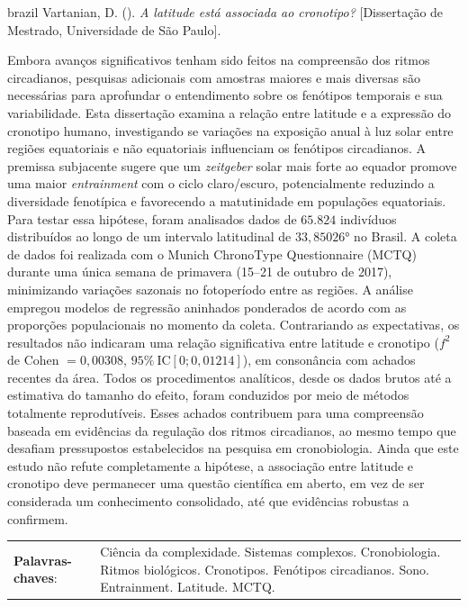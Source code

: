 \documentclass[
12pt,
openright,
oneside,
a4paper,
chapter=TITLE,
section=TITLE,
french,
spanish,
brazil,
english
]{abntex2}
\newcommand{\resumoestrangeironame}{Resumo}
\renewcommand{\resumoname}{Abstract}
\renewcommand{\resumoestrangeironame}{Resumo}
\renewcommand{\resumoname}{Resumo}
\renewcommand{\resumoestrangeironame}{Abstract}
\renewcommand{\resumoname}{Resumen}
\renewcommand{\resumoestrangeironame}{Resumo}
\renewcommand{\resumoname}{Résumé}
\renewcommand{\resumoestrangeironame}{Resumo}
\newenvironment{resumoenv}[1][\resumoname]{
  \pretextualchapter{#1}
  \begingroup
  \setlength{\parindent}{0cm}
  \setlength{\parskip}{\smallskipamount} %
  \AtBeginEnvironment{tabular}{\normalsize}
  \renewcommand{\arraystretch}{1}
  \setlength{\aboverulesep}{0ex}
  \setlength{\belowrulesep}{0ex}
  \setlength{\arrayrulewidth}{0pt}
  \setlength{\tabcolsep}{0cm}
  \vspace{-\smallskipamount} %
  \begin{SingleSpace}
}{
  \end{SingleSpace}
  \cleardoublepage
  \endgroup
}
\renewcommand{\arraystretch}{1.5}
\begin{document}

\begin{resumoenv}[\resumoestrangeironame]
\begin{otherlanguage*}{brazil}
Vartanian, D. ({\imprimirdata}). \textit{A latitude está associada ao cronotipo?} [Dissertação de Mestrado, Universidade de São Paulo].


Embora avanços significativos tenham sido feitos na compreensão dos
ritmos circadianos, pesquisas adicionais com amostras maiores e mais
diversas são necessárias para aprofundar o entendimento sobre os
fenótipos temporais e sua variabilidade. Esta dissertação examina a
relação entre latitude e a expressão do cronotipo humano, investigando
se variações na exposição anual à luz solar entre regiões equatoriais e
não equatoriais influenciam os fenótipos circadianos. A premissa
subjacente sugere que um \emph{zeitgeber} solar mais forte ao equador
promove uma maior \emph{entrainment} com o ciclo claro/escuro,
potencialmente reduzindo a diversidade fenotípica e favorecendo a
matutinidade em populações equatoriais. Para testar essa hipótese, foram
analisados dados de \(65.824\) indivíduos distribuídos ao longo de um
intervalo latitudinal de \(33,85026°\) no Brasil. A coleta de dados foi
realizada com o Munich ChronoType Questionnaire (MCTQ) durante uma única
semana de primavera (15--21 de outubro de 2017), minimizando variações
sazonais no fotoperíodo entre as regiões. A análise empregou modelos de
regressão aninhados ponderados de acordo com as proporções populacionais
no momento da coleta. Contrariando as expectativas, os resultados não
indicaram uma relação significativa entre latitude e cronotipo (\(f^2\)
de Cohen \(= 0,00308\), \(95\% \ \text{IC}[0; 0,01214]\)), em
consonância com achados recentes da área. Todos os procedimentos
analíticos, desde os dados brutos até a estimativa do tamanho do efeito,
foram conduzidos por meio de métodos totalmente reprodutíveis. Esses
achados contribuem para uma compreensão baseada em evidências da
regulação dos ritmos circadianos, ao mesmo tempo que desafiam
pressupostos estabelecidos na pesquisa em cronobiologia. Ainda que este
estudo não refute completamente a hipótese, a associação entre latitude
e cronotipo deve permanecer uma questão científica em aberto, em vez de
ser considerada um conhecimento consolidado, até que evidências robustas
a confirmem.


\begin{tabular}{p{4cm} p{11.9cm}}
  \textbf{Palavras-chaves}: &  Ciência da complexidade. Sistemas complexos. Cronobiologia. Ritmos biológicos. Cronotipos. Fenótipos circadianos. Sono. Entrainment. Latitude. MCTQ.
\end{tabular}
\end{otherlanguage*}
\end{resumoenv}
\end{document}
